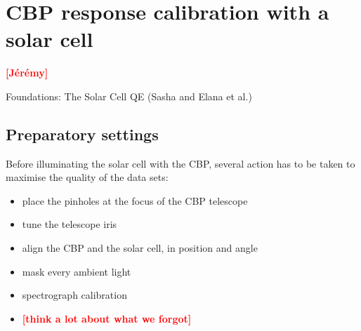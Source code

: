 \documentclass[onecolumn]{aa}
\newcommand{\Oldthorlabs}{SM05PD1B}
\newcommand{\todo}[1]{\textbf{\textcolor{red}{[#1]}}\xspace}
\begin{document}
\section{CBP response calibration with a solar cell}
\label{sec:rcbp}


%
%
%
%
%
%
%
%

\todo{Jérémy}

Foundations: The Solar Cell QE (Sasha and Elana et al.)

\subsection{Preparatory settings}

Before illuminating the solar cell with the CBP, several action has to be taken to maximise the quality of the data sets:
\begin{itemize}
\item place the pinholes at the focus of the CBP telescope
\item tune the telescope iris
\item align the CBP and the solar cell, in position and angle
\item mask every ambient light
\item spectrograph calibration
\item \todo{think a lot about what we forgot}
\end{itemize}
\end{document}
